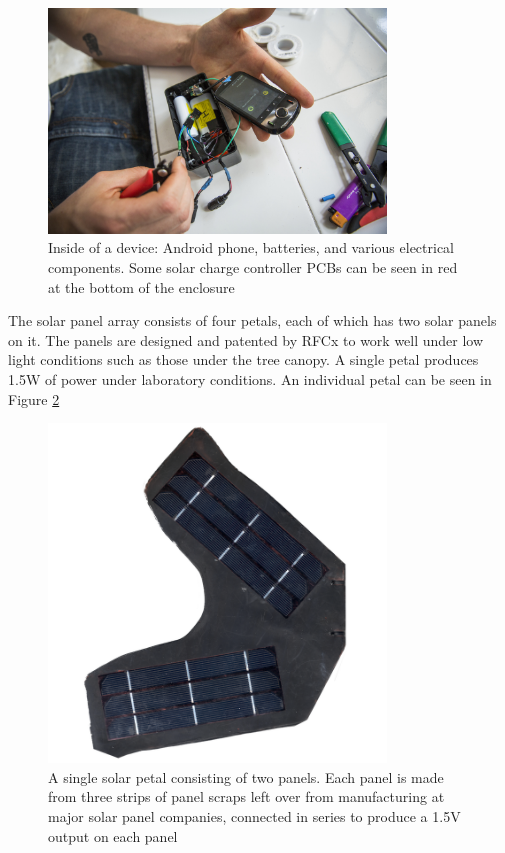 \documentclass{article}
\numberwithin{figure}{section}
\numberwithin{equation}{section}
\begin{document}
{\begin{figure}[H]
  \centering
  \includegraphics[width=0.8\textwidth]{device_inside}
  \caption{Inside of a device: Android phone, batteries, and various electrical components. Some solar charge controller PCBs can be seen in red at the bottom of the enclosure}
  \label{fig:device_inside}
\end{figure}
\newpage

The solar panel array consists of four petals, each of which has two solar panels on it. The panels are designed and patented by RFCx to work well under low light conditions such as those under the tree canopy. A single petal produces 1.5W of power under laboratory conditions. An individual petal can be seen in Figure \ref{fig:solar_petal}

\begin{figure}[H]
  \centering
  \includegraphics[width=0.8\textwidth]{solar_petal}
  \caption{A single solar petal consisting of two panels. Each panel is made from three strips of panel scraps left over from manufacturing at major solar panel companies, connected in series to produce a 1.5V output on each panel}
  \label{fig:solar_petal}
\end{figure}
\newpage

}
\end{document}
